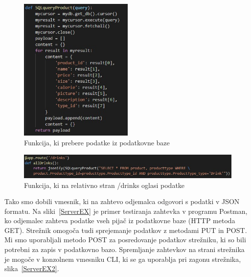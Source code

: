 \documentclass[a4paper, 12pt]{book}
\begin{document}
\begin{figure}[!htb]
\begin{center}
\includegraphics[width=0.5\textwidth]{drinks_1.jpg}
\caption{Funkcija, ki prebere podatke iz podatkovne baze}
\label{Drinks_DB_function}
\end{center}
\end{figure}

\begin{figure}[!htb]
\begin{center}
\includegraphics[width=14cm]{drinks_2.jpg}
\caption{Funkcija, ki na relativno stran /drinks oglasi podatke}
\label{Drinks_URI}
\end{center}
\end{figure}

Tako smo dobili vmesnik, ki na zahtevo odjemalca odgovori s podatki v JSON formatu. Na sliki~\ref{ServerEX} je primer testiranja zahtevka v programu Postman, ko odjemalec zahteva podatke vseh pijač iz podatkovne baze (HTTP metoda GET). Strežnik omogoča tudi sprejemanje podatkov z metodami PUT in POST. Mi smo uporabljali metodo POST za posredovanje podatkov strežniku, ki so bili potrebni za zapis v podatkovno bazo. Spremljanje zahtevkov na strani strežnika je mogoče v konzolnem vmesniku CLI, ki se ga uporablja pri zagonu strežnika, slika~\ref{ServerEX2}.
\end{document}
